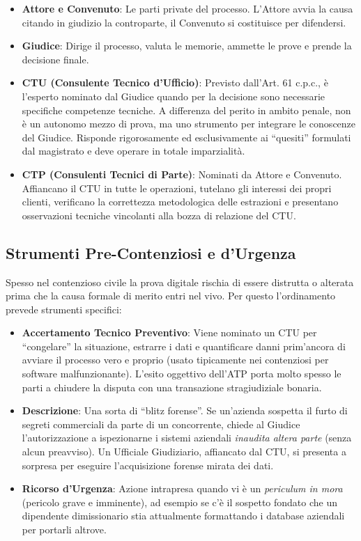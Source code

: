 \documentclass[11pt,a4paper]{article}
\begin{document}
\begin{itemize}
    \item \textbf{Attore e Convenuto}: Le parti private del processo. L'Attore avvia la causa citando in giudizio la controparte, il Convenuto si costituisce per difendersi.
    \item \textbf{Giudice}: Dirige il processo, valuta le memorie, ammette le prove e prende la decisione finale.
    \item \textbf{CTU (Consulente Tecnico d'Ufficio)}: Previsto dall'Art. 61 c.p.c., è l'esperto nominato dal Giudice quando per la decisione sono necessarie specifiche competenze tecniche. A differenza del perito in ambito penale, non è un autonomo mezzo di prova, ma uno strumento per integrare le conoscenze del Giudice. Risponde rigorosamente ed esclusivamente ai ``quesiti'' formulati dal magistrato e deve operare in totale imparzialità.
    \item \textbf{CTP (Consulenti Tecnici di Parte)}: Nominati da Attore e Convenuto. Affiancano il CTU in tutte le operazioni, tutelano gli interessi dei propri clienti, verificano la correttezza metodologica delle estrazioni e presentano osservazioni tecniche vincolanti alla bozza di relazione del CTU.
\end{itemize}

\subsection{Strumenti Pre-Contenziosi e d'Urgenza}

Spesso nel contenzioso civile la prova digitale rischia di essere distrutta o alterata prima che la causa formale di merito entri nel vivo. Per questo l'ordinamento prevede strumenti specifici:
\begin{itemize}
    \item \textbf{Accertamento Tecnico Preventivo}: Viene nominato un CTU per ``congelare'' la situazione, estrarre i dati e quantificare danni prim'ancora di avviare il processo vero e proprio (usato tipicamente nei contenziosi per software malfunzionante). L'esito oggettivo dell'ATP porta molto spesso le parti a chiudere la disputa con una transazione stragiudiziale bonaria.
    \item \textbf{Descrizione}: Una sorta di ``blitz forense''. Se un'azienda sospetta il furto di segreti commerciali da parte di un concorrente, chiede al Giudice l'autorizzazione a ispezionarne i sistemi aziendali \textit{inaudita altera parte} (senza alcun preavviso). Un Ufficiale Giudiziario, affiancato dal CTU, si presenta a sorpresa per eseguire l'acquisizione forense mirata dei dati.
    \item \textbf{Ricorso d'Urgenza}: Azione intrapresa quando vi è un \textit{periculum in mora} (pericolo grave e imminente), ad esempio se c'è il sospetto fondato che un dipendente dimissionario stia attualmente formattando i database aziendali per portarli altrove.
\end{itemize}
\end{document}
